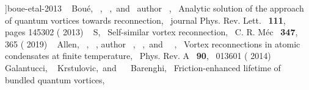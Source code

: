\documentclass[%
 reprint,
unsortedaddress,
 amsmath,amssymb,
 aps,
 prl,
]{revtex4-2}
\begin{document}
\begin{thebibliography}{38}
{	  }]{boue-etal-2013}%
	  \BibitemOpen
	   { {~\bibnamefont
	  {Bou\'{e}}},  {~},
	   {~},\ and\ \bibinfo
	  {author} {~},\ }
	  { {Analytic solution of the approach of quantum vortices
	  towards reconnection},\ }\href@noop {} { {\bibinfo
	  {journal} {Phys. Rev. Lett.}\ }\textbf { {111}},\ \bibinfo
	  {pages} {145302} ( {2013})}%
	  \BibitemOpen
	   { {~\bibnamefont
	  {S}},\ } { {Self-similar vortex
	  reconnection},\ }\href@noop {} { { {C.
	  R. M\'{e}c}\ }\textbf { {347}},\  {365}
	  ( {2019})}%
	  \BibitemOpen
	   { {\ \bibnamefont
	  {Allen}},  {~},
	   {~}, \bibinfo
	  {author} {\ }, 
	  {\ },\ and\ 
	  {\ },\ }
	  { {Vortex reconnections in atomic condensates at finite
	  temperature},\ }\href@noop {} { {
	  {Phys. Rev. A}\ }\textbf { {90}},\  {013601}
	  ( {2014})}%
	  \BibitemOpen
	   { {~\bibnamefont
	  {Galantucci}},  {~\bibnamefont
	  {Krstulovic}},\ and\  {~\bibnamefont
	  {Barenghi}},\ } { {Friction-enhanced
	  lifetime of bundled quantum vortices},\ }\href@noop {} {
}
\end{thebibliography}
\end{document}
